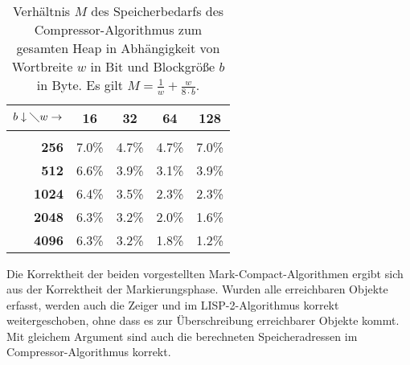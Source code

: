 \begin{table}[h]
	\centering \renewcommand{\arraystretch}{1.15} 
	\begin{tabular}{|r|cccc|}
		\hline
		$b \downarrow \diagdown w \rightarrow$ &  \textbf{16}   &  \textbf{32}   &  \textbf{64}   &  \textbf{128}  \\ \hline
                             & \hspace{1.5cm}  &  \hspace{1.5cm}  &  \hspace{1.5cm}   &   \hspace{1.5cm}   \\[-0.6cm]
		                                 \textbf{256} & 7.0\% & 4.7\% & 4.7\% & 7.0\% \\ \hline
		                                 \textbf{512} & 6.6\% & 3.9\% & 3.1\% & 3.9\% \\ \hline
		                                \textbf{1024} & 6.4\% & 3.5\% & 2.3\% & 2.3\% \\ \hline
		                                \textbf{2048} & 6.3\% & 3.2\% & 2.0\% & 1.6\% \\ \hline
		                                \textbf{4096} & 6.3\% & 3.2\% & 1.8\% & 1.2\% \\ \hline
	\end{tabular} 

	\vspace*{0.3cm}
	
	\caption[Speicherbedarf des Compressor-Algorithmus]{Verhältnis $M$ des Speicherbedarfs des Compressor-Algorithmus zum gesamten Heap in Abhängigkeit von Wortbreite $w$ in Bit und Blockgröße $b$ in Byte. Es gilt $M = \frac{1}{w} + \frac{w}{8 \cdot b}$.}
	\label{tab:compressor}
\end{table}

Die Korrektheit der beiden vorgestellten Mark-Compact-Algorithmen ergibt sich aus der Korrektheit der Markierungsphase.
Wurden alle erreichbaren Objekte erfasst, werden auch die Zeiger  und  im LISP-2-Algorithmus korrekt weitergeschoben, ohne dass es zur Überschreibung erreichbarer Objekte kommt.
Mit gleichem Argument sind auch die berechneten Speicheradressen im Compressor-Algorithmus korrekt.




